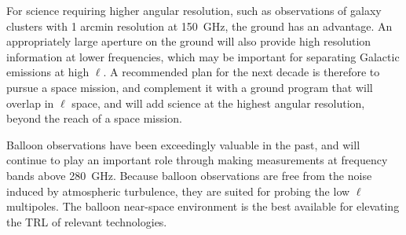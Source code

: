 \documentclass[PICOReport.tex]{subfiles}
\begin{document}
For science requiring higher angular resolution, such as observations of galaxy clusters with 1 arcmin resolution at 150~GHz, the ground has an advantage. An appropriately large aperture on the ground will also provide high resolution information at lower frequencies, which may be important for separating Galactic emissions at high $\ell$. A recommended plan for the next decade is therefore to pursue a space mission, and complement it with a ground program that will overlap in $\ell$ space, and will add science at the highest angular resolution, beyond the reach of a space mission.

Balloon observations have been exceedingly valuable in the past, and will continue to play an important role through making measurements at frequency bands above 280~GHz. Because balloon observations are free from the noise induced by atmospheric turbulence, they are suited for probing the low $\ell$ multipoles. The balloon near-space environment is the best available for elevating the TRL of relevant technologies. 



\end{document}
